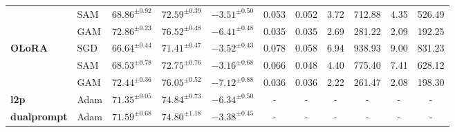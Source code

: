 \documentclass{article}
\theoremstyle{plain}
\theoremstyle{definition}
\theoremstyle{remark}
\begin{document}
\begin{table}[htpb]
{\begin{tabular}{l l ccc ccccc c}
& SAM    &$68.86^{\pm 0.92}$ & $72.59^{\pm 0.39}$ & $-3.51^{\pm 0.50}$ & 0.053   & 0.052 & 3.72    & 712.88   & 4.35   & 526.49   \\
 &GAM  &$72.86^{\pm 0.23}$ & $76.52^{\pm 0.48}$ & $-6.41^{\pm 0.48}$ & 0.035   & 0.035 & 2.69    & 281.22   & 2.09   & 192.25   \\
\midrule
\multirow{2}{*}{\textbf{OLoRA}}
& SGD    &$66.64^{\pm 0.44}$ & $71.41^{\pm 0.47}$ & $-3.52^{\pm 0.43}$ & 0.078   & 0.058 & 6.94    & 938.93   & 9.00   & 831.23   \\
& SAM    &$68.53^{\pm 0.78}$ & $72.75^{\pm 0.76}$ & $-3.16^{\pm 0.68}$ & 0.066   & 0.048 & 4.40    & 775.40   & 7.41   & 628.12   \\
 &GAM &$72.44^{\pm 0.36}$ & $76.05^{\pm 0.52}$ & $-7.12^{\pm 0.88}$ & 0.036   & 0.036 & 2.22    & 261.47   & 2.08   & 198.30\\
\midrule
\multirow{1}{*}{\textbf{l2p}}
& Adam   & $71.35^{\pm 0.05}$ & $74.84^{\pm 0.73}$ & $-6.34^{\pm 0.50}$  &-  &- &- &- &- &- \\
\midrule
\multirow{1}{*}{\textbf{dualprompt}}
& Adam   & $71.59^{\pm 0.68}$ & $74.80^{\pm 1.18}$ & $-3.38^{\pm 0.45}$ &-  &- &- &- &- &- \\
\bottomrule
\end{tabular}
}
\end{table}
\end{document}
